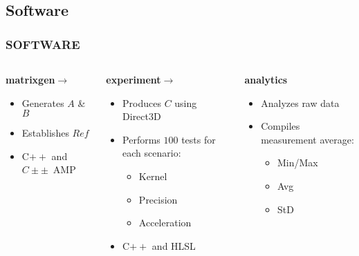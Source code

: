\subsection{Software}
\begin{frame}
\frametitle{SOFTWARE}

\begin{columns}[T]
  \begin{column}{0.33\textwidth}
    \textbf{matrixgen}\hfill$\rightarrow$\hfill
    \begin{itemize}
    \item Generates $A$ \& $B$
    \item Establishes $Ref$
    \item C$++$ and $C±±$~AMP
    \end{itemize}
  \end{column}
  \begin{column}{0.33\textwidth}
    \textbf{experiment}\hfill$\rightarrow$\hfill
    \begin{itemize}
    \item Produces $C$ using Direct3D
    \item Performs $100$ tests for each scenario:
      \begin{itemize}
      \item Kernel
      \item Precision\footnotemark
      \item Acceleration
      \end{itemize}
    \item C$++$ and HLSL
    \end{itemize}
  \end{column}
  \begin{column}{0.33\textwidth}
    \textbf{analytics}
    \begin{itemize}
    \item Analyzes raw data
    \item Compiles measurement average:
      \begin{itemize}
      \item Min/Max
      \item Avg
      \item StD
      \end{itemize}
    \end{itemize}
  \end{column}
\end{columns}


\end{frame}
